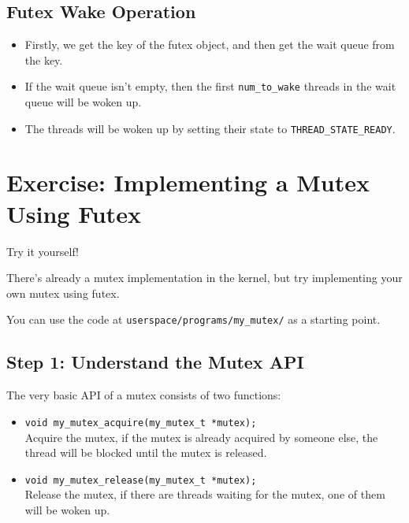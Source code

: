 \subsection{Futex Wake Operation}

\begin{itemize}
    \item Firstly, we get the key of the futex object, and then get the wait queue
          from the key.
    \item If the wait queue isn't empty, then the first \texttt{num\_to\_wake} threads
          in the wait queue will be woken up.
    \item The threads will be woken up by setting their state to \texttt{THREAD\_STATE\_READY}.
\end{itemize}

\section*{Exercise: Implementing a Mutex Using Futex}

\begin{exercise*}{Try it yourself!}
    \item There's already a mutex implementation in the kernel, but try implementing
    your own mutex using futex.
    \item You can use the code at \texttt{userspace/programs/my\_mutex/} as a starting point.
\end{exercise*}

\subsection{Step 1: Understand the Mutex API}

The very basic API of a mutex consists of two functions:

\begin{itemize}
    \item \texttt{void my\_mutex\_acquire(my\_mutex\_t *mutex);} \\
          Acquire the mutex, if the mutex is already acquired by someone else, the
          thread will be blocked until the mutex is released.
    \item \texttt{void my\_mutex\_release(my\_mutex\_t *mutex);} \\
          Release the mutex, if there are threads waiting for the mutex, one of them
          will be woken up.
\end{itemize}

